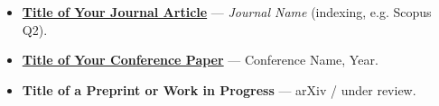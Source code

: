 \begin{itemize}
  \item \href{https://doi.org/10.0000/example-1}{\textbf{Title of Your Journal Article}} --- \textit{Journal Name} (indexing, e.g. Scopus Q2).
  \item \href{https://doi.org/10.0000/example-2}{\textbf{Title of Your Conference Paper}} --- Conference Name, Year.
  \item \textbf{Title of a Preprint or Work in Progress} --- arXiv / under review.
\end{itemize}
